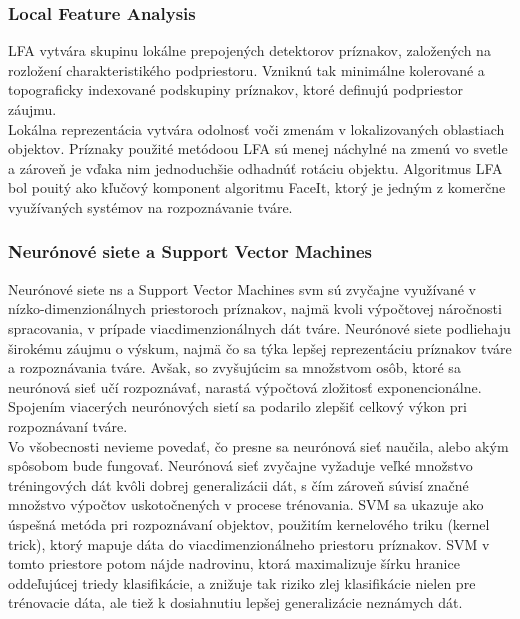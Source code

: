 \subsubsection{Local Feature Analysis}
LFA vytvára skupinu lokálne prepojených detektorov príznakov, založených na rozložení charakteristikého podpriestoru.
Vzniknú tak minimálne kolerované a topograficky indexované podskupiny príznakov, ktoré definujú podpriestor záujmu. \cite{handbookbio} \\

\indent Lokálna reprezentácia vytvára odolnosť voči zmenám v lokalizovaných oblastiach objektov.
Príznaky použité metódoou LFA sú menej náchylné na zmenú vo svetle a zároveň je vďaka nim jednoduchšie odhadnúť
rotáciu objektu.
Algoritmus LFA bol pouitý ako kľučový komponent algoritmu FaceIt, ktorý je jedným z komerčne využívaných systémov na rozpoznávanie tváre\cite{handbookbio}.

\subsubsection{Neurónové siete a Support Vector Machines}
Neurónové siete \acrshort{ns} a Support Vector Machines \acrshort{svm} sú zvyčajne využívané v nízko-dimenzionálnych priestoroch príznakov, najmä kvoli výpočtovej náročnosti spracovania,
v prípade viacdimenzionálnych dát tváre\cite{handbookbio}.
Neurónové siete podliehaju širokému záujmu o výskum, najmä čo sa týka lepšej reprezentáciu príznakov tváre a rozpoznávania tváre.
Avšak, so zvyšujúcim sa množstvom osôb, ktoré sa neurónová sieť učí rozpoznávať, narastá výpočtová zložitosť exponencionálne.
Spojením viacerých neurónových sietí sa podarilo zlepšiť celkový výkon pri rozpoznávaní tváre.\\

\indent Vo všobecnosti nevieme povedať, čo presne sa neurónová sieť naučila, alebo akým spôsobom bude fungovať.
Neurónová sieť zvyčajne vyžaduje veľké množstvo tréningových dát kvôli dobrej generalizácii dát, s čím zároveň súvisí značné množstvo výpočtov uskotočnených v procese trénovania.
SVM sa ukazuje ako úspešná metóda pri rozpoznávaní objektov, použitím kernelového triku (kernel trick), ktorý mapuje dáta do viacdimenzionálneho priestoru príznakov\cite{handbookbio}.
SVM v tomto priestore potom nájde nadrovinu, ktorá maximalizuje šírku hranice oddeľujúcej triedy klasifikácie, a znižuje tak riziko zlej klasifikácie nielen pre trénovacie dáta,
ale tiež k dosiahnutiu lepšej generalizácie neznámych dát.\cite{handbookbio} \\

